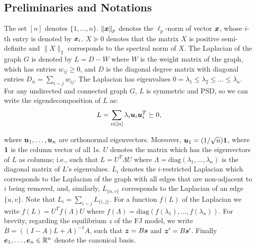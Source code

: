 

\subsection{Preliminaries and Notations}

The set $[n]$ denotes $\{ 1, \dots, n \}$. $\| \bm{x} \|_p$ denotes the $\ell_p$-norm of vector $\bm{x}$, whose $i$-th entry is denoted by $\bm{x}_i$. $X \succeq 0$ denotes that the matrix $X$ is positive semi-definite and $\| X \|_2$ corresponds to the spectral norm of $X$. The Laplacian of the graph $G$ is denoted by $L = D - W$ where $W$ is the weight matrix of the graph, which has entries $w_{ij} \ge 0$, and $D$ is the diagonal degree matrix with diagonal entries $D_{ii} = \sum_{i \sim j} w_{ij}$. The Laplacian has eigenvalues $0 = \lambda_1 \le \lambda_2 \le \dots \le \lambda_n$. For any undirected and connected graph $G$, $L$ is symmetric and PSD, so we can write the eigendecomposition of $L$ as: 
\begin{equation}
    L = \sum_{i \in [n]} \lambda_i \bm{u}_i \bm{u}_i^T \succeq 0,
\end{equation}

where $\bm{u}_1, \dots, \bm{u}_n$ are orthonormal eigenvectors. Moreover, $\bm{u}_1 = (1 / \sqrt n) \mathbf {1}$, where $\mathbf {1}$ is the column vector of all 1s. $U$ denotes the matrix which has the eigenvectors of $L$ as columns; i.e., such that $L = U^T \Lambda U$ where $\Lambda = \mathrm{diag} (\lambda_1, \dots, \lambda_n)$ is the diagonal matrix of $L$'s eigenvalues. $L_i$ denotes the $i$-restricted Laplacian which corresponds to the Laplacian of the graph with all edges that are non-adjacent to $i$ being removed, and, similarly, $L_{\{ u, v \}}$ corresponds to the Laplacian of an edge $\{ u, v\}$. Note that $L_i = \sum_{i \sim j} L_{\{ i, j \}}$. For a function $f(L)$ of the Laplacian we write $f(L) = U^T f(\Lambda) U$ where $f(\Lambda) = \mathrm{diag} (f(\lambda_1), \dots, f(\lambda_n))$. For brevity, regarding the equilibrium $z$ of the FJ model, we write $B =((I - A)L + A)^{-1} A$, such that $\bm{z} = B \bm{s}$ and $\bm{z}^\prime = B \bm{s}^\prime$. Finally $\bm{e}_1, \dots, \bm{e}_n \in \mathbb{R}^n$ denote the canonical basis. 

